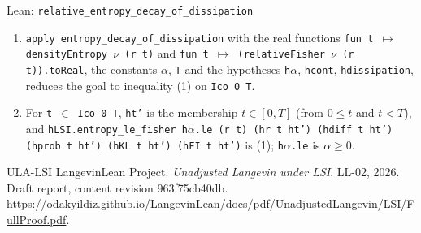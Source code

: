 \documentclass[11pt,a4paper]{article}
\begin{document}
\begin{leanbox}{Lean: \texttt{relative\_\allowbreak{}entropy\_\allowbreak{}decay\_\allowbreak{}of\_\allowbreak{}dissipation}}
\begin{enumerate}


\item \texttt{apply entropy\_\allowbreak{}decay\_\allowbreak{}of\_\allowbreak{}dissipation} with the real functions \texttt{fun t \ensuremath{\mapsto} density\allowbreak{}Entropy \ensuremath{\nu} (r t)} and \texttt{fun t \ensuremath{\mapsto} (relative\allowbreak{}Fisher \ensuremath{\nu} (r t)).\allowbreak{}to\allowbreak{}Real}, the constants \texttt{\ensuremath{\alpha}}, \texttt{T} and the hypotheses \texttt{h\ensuremath{\alpha}}, \texttt{hcont}, \texttt{hdissipation}, reduces the goal to inequality (1) on \texttt{Ico 0 T}.

\item For \texttt{t \ensuremath{\in} Ico 0 T}, \texttt{ht'} is the membership \(t\in[0,T]\) (from \(0\le t\) and \(t<T\)), and \texttt{h\allowbreak{}LSI.\allowbreak{}entropy\_\allowbreak{}le\_\allowbreak{}fisher h\ensuremath{\alpha}.\allowbreak{}le (r t) (hr t ht') (hdiff t ht') (hprob t ht') (h\allowbreak{}KL t ht') (h\allowbreak{}FI t ht')} is (1); \texttt{h\ensuremath{\alpha}.\allowbreak{}le} is \(\alpha\ge0\).

\end{enumerate}
\end{leanbox}

\begin{thebibliography}{ULA-LSI}
LangevinLean Project. \emph{Unadjusted Langevin under LSI}. LL-02, 2026. Draft report, content revision 963f75cb40db. \url{https://odakyildiz.github.io/LangevinLean/docs/pdf/UnadjustedLangevin/LSI/FullProof.pdf}.
\end{thebibliography}
\end{document}
